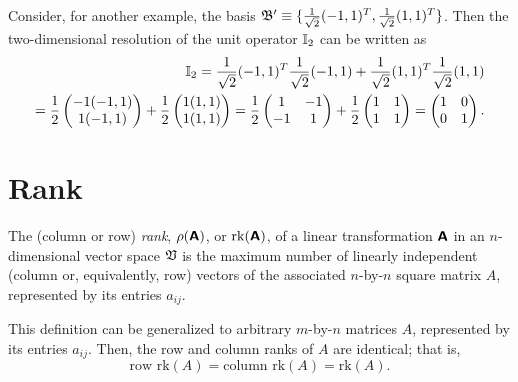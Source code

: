{Consider, for another example, the basis
${\frak B}' \equiv \{\frac{1}{\sqrt{2}}(-1,1)^T,\frac{1}{\sqrt{2}}(1,1)^T\}$.
Then the two-dimensional resolution of the unit operator ${\Bbb I}_2$
can be written as
\begin{equation}
\begin{split}
{\Bbb I}_2 =  \frac{1}{\sqrt{2}}   (-1,1)^T  \frac{1}{\sqrt{2}}(-1,1) +   \frac{1}{\sqrt{2}}(1,1)^T \frac{1}{\sqrt{2}}(1,1)
\\
=
\frac{1}{{2}}
\begin{pmatrix}
-1 (-1,1) \\  1 (-1,1)
\end{pmatrix}
 +
\frac{1}{{2}}
\begin{pmatrix}
1 (1,1)\\
1 (1,1)
\end{pmatrix}
 =
\frac{1}{{2}}
\begin{pmatrix}
1 & -1 \\
-1 & 1
\end{pmatrix}
+
\frac{1}{{2}}
\begin{pmatrix}
1 & 1 \\
1 & 1
\end{pmatrix}
=
\begin{pmatrix}
1 & 0 \\
0 & 1
\end{pmatrix}
.
\end{split}
\end{equation}


\eexample
}


\section{Rank}
\label{2014-m-fdvs-rank}

The (column or row) {\em rank}, $\rho (  \textsf{\textbf{A}}  )$,
or $\textrm{rk} ( \textsf{\textbf{A}} )$,
of a linear transformation $ \textsf{\textbf{A}} $
in an $n$-dimensional vector space ${\frak V}$
is the maximum number of linearly independent (column or, equivalently,
row) vectors of the associated
$n$-by-$n$ square matrix $ A $, represented by its entries  $a_{ij}$.

This definition can be generalized to arbitrary
$m$-by-$n$ matrices $A$, represented by its entries  $a_{ij}$.
Then, the row and column ranks of $A$ are identical; that is,
\begin{equation}
\textrm{row rk} (A) =
\textrm{column rk} (A)  =
\textrm{rk} (A).
\end{equation}


